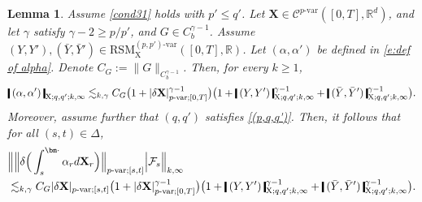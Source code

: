 \documentclass[11pt,reqno]{amsart}
\newtheorem{lemma}{Lemma}[section]
\numberwithin{equation}{section}
\def\R{\mathbb R}
\newcommand{\shortthickbar}{%
  \vcenter{\hbox{\rule{1.8pt}{2.2ex}}}%
}
\newcommand{\thicknm}[1]{%
  \mathopen{\shortthickbar}%
  \mkern4mu #1 \mkern4mu%
  \mathclose{\shortthickbar}%
}
\begin{document}
\begin{lemma}\label{lem:int of RSM'}
Assume \eqref{cond31} holds with $p' \le q'$. Let $\mathbf X \in \mathscr C^{p\text{-}\mathrm{var}}([0,T],\R^d)$, and let $\gamma$ satisfy $\gamma - 2 \ge p/p'$, and $G \in C^{\gamma - 1}_b$. Assume $(Y,Y'),(\bar Y,\bar Y') \in \mathrm{RSM}^{(p,p')\text{-}\mathrm{var}}_{\mathrm X}([0,T],\R)$. Let $(\alpha,\alpha')$ be defined in \eqref{e:def of alpha}. Denote $C_G := \|G\|_{C^{\gamma - 1}_b}$. 
Then, for every $k \ge 1$,   
\begin{equation}\label{e:Psi alpha}
\begin{aligned}
\thicknm{(\alpha,\alpha') }_{\mathrm X;q,q' ; k , \infty} \lesssim_{k,\gamma} C_G \big(1 + |\delta \mathbf X|^{\gamma - 1}_{p\text{-}\mathrm{var};[0,T]}\big) \big(1 + \thicknm{(Y,Y')}_{\mathrm X;q,q';k,\infty}^{\gamma - 1} + \thicknm{(\bar Y,\bar Y')}_{\mathrm X;q,q';k,\infty}^{\gamma - 1}\big).
\end{aligned}
\end{equation}
Moreover, assume further that $(q,q')$ satisfies \ref{(p,q,q')}. Then, it follows that for all $(s,t)\in \Delta$, 
\begin{equation}\label{e:Psi alpha'}
\begin{aligned}
&\Big\| \Big\|\delta \Big( \int_{s}^{\bm\cdot}\alpha_{r}d\mathbf X_r \Big) \Big\|_{p\text{-}\mathrm{var};[s,t]} \Big| \mathcal F_s \Big\|_{k,\infty} \\
&\lesssim_{k,\gamma} C_G |\delta \mathbf X|_{p\text{-}\mathrm{var};[s,t]} \big(1 + |\delta \mathbf X|^{\gamma - 1}_{p\text{-}\mathrm{var};[0,T]} \big) \big(1 + \thicknm{(Y,Y')}_{\mathrm X;q,q';k,\infty}^{\gamma - 1} + \thicknm{(\bar Y,\bar Y')}_{\mathrm X;q,q';k,\infty}^{\gamma - 1} \big).
\end{aligned}
\end{equation}
\end{lemma}
\end{document}

